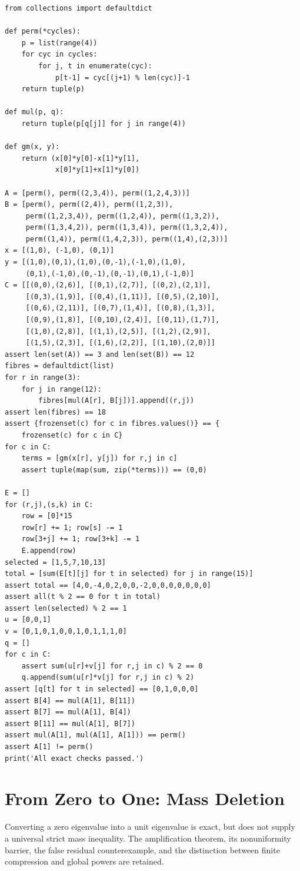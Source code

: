 \documentclass[11pt,a4paper,oneside]{report}
\theoremstyle{definition}
\theoremstyle{remark}
\newcommand{\compilationnote}[1]{\medskip\noindent{\small\color{accent}\textbf{Compilation note --- 23 November 2026.}}\par
{\small #1}\par\medskip}
\begin{document}
\begin{lstlisting}
from collections import defaultdict

def perm(*cycles):
    p = list(range(4))
    for cyc in cycles:
        for j, t in enumerate(cyc):
            p[t-1] = cyc[(j+1) % len(cyc)]-1
    return tuple(p)

def mul(p, q):
    return tuple(p[q[j]] for j in range(4))

def gm(x, y):
    return (x[0]*y[0]-x[1]*y[1],
            x[0]*y[1]+x[1]*y[0])

A = [perm(), perm((2,3,4)), perm((1,2,4,3))]
B = [perm(), perm((2,4)), perm((1,2,3)),
     perm((1,2,3,4)), perm((1,2,4)), perm((1,3,2)),
     perm((1,3,4,2)), perm((1,3,4)), perm((1,3,2,4)),
     perm((1,4)), perm((1,4,2,3)), perm((1,4),(2,3))]
x = [(1,0), (-1,0), (0,1)]
y = [(1,0),(0,1),(1,0),(0,-1),(-1,0),(1,0),
     (0,1),(-1,0),(0,-1),(0,-1),(0,1),(-1,0)]
C = [[(0,0),(2,6)], [(0,1),(2,7)], [(0,2),(2,1)],
     [(0,3),(1,9)], [(0,4),(1,11)], [(0,5),(2,10)],
     [(0,6),(2,11)], [(0,7),(1,4)], [(0,8),(1,3)],
     [(0,9),(1,8)], [(0,10),(2,4)], [(0,11),(1,7)],
     [(1,0),(2,8)], [(1,1),(2,5)], [(1,2),(2,9)],
     [(1,5),(2,3)], [(1,6),(2,2)], [(1,10),(2,0)]]
assert len(set(A)) == 3 and len(set(B)) == 12
fibres = defaultdict(list)
for r in range(3):
    for j in range(12):
        fibres[mul(A[r], B[j])].append((r,j))
assert len(fibres) == 18
assert {frozenset(c) for c in fibres.values()} == {
    frozenset(c) for c in C}
for c in C:
    terms = [gm(x[r], y[j]) for r,j in c]
    assert tuple(map(sum, zip(*terms))) == (0,0)

E = []
for (r,j),(s,k) in C:
    row = [0]*15
    row[r] += 1; row[s] -= 1
    row[3+j] += 1; row[3+k] -= 1
    E.append(row)
selected = [1,5,7,10,13]
total = [sum(E[t][j] for t in selected) for j in range(15)]
assert total == [4,0,-4,0,2,0,0,-2,0,0,0,0,0,0,0]
assert all(t % 2 == 0 for t in total)
assert len(selected) % 2 == 1
u = [0,0,1]
v = [0,1,0,1,0,0,1,0,1,1,1,0]
q = []
for c in C:
    assert sum(u[r]+v[j] for r,j in c) % 2 == 0
    q.append(sum(u[r]*v[j] for r,j in c) % 2)
assert [q[t] for t in selected] == [0,1,0,0,0]
assert B[4] == mul(A[1], B[11])
assert B[7] == mul(A[1], B[4])
assert B[11] == mul(A[1], B[7])
assert mul(A[1], mul(A[1], A[1])) == perm()
assert A[1] != perm()
print('All exact checks passed.')
\end{lstlisting}



\chapter{From Zero to One: Mass Deletion}\label{chap:M05}
\par
\compilationnote{Converting a zero eigenvalue into a unit eigenvalue is exact, but does
not supply a universal strict mass inequality. The amplification theorem,
its nonuniformity barrier, the false residual counterexample, and the
distinction between finite compression and global powers are retained.}
\end{document}
